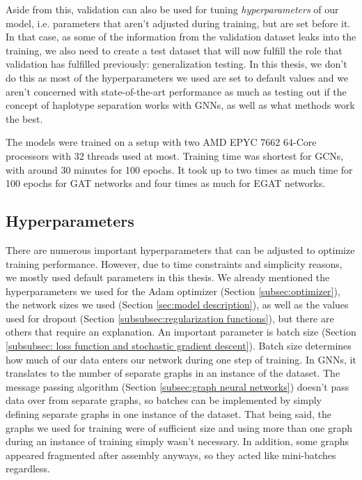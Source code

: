 \documentclass[times, utf8, diplomski, english]{fer_eng}
\begin{document}
Aside from this, validation can also be used for tuning \textit{hyperparameters} of our model, i.e. parameters that aren't adjusted during training, but are set before it. In that case, as some of the information from the validation dataset leaks into the training,  we also need to create a test dataset that will now fulfill the role that validation has fulfilled previously: generalization testing. In this thesis, we don't do this as most of the hyperparameters we used are set to default values and we aren't concerned with state-of-the-art performance as much as testing out if the concept of haplotype separation works with GNNs, as well as what methods work the best.

The models were trained on a setup with two AMD EPYC 7662 64-Core processors with 32 threads used at most. Training time was shortest for GCNs, with around 30 minutes for 100 epochs. It took up to two times as much time for 100 epochs for GAT networks and four times as much for EGAT networks.

\subsection{Hyperparameters}
\label{subsec:hyperparameters}

There are numerous important hyperparameters that can be adjusted to optimize training performance. However, due to time constraints and simplicity reasons, we mostly used default parameters in this thesis. We already mentioned the hyperparameters we used for the Adam optimizer (Section \ref{subsec:optimizer}), the network sizes we used (Section \ref{sec:model description}), as well as the values used for dropout (Section \ref{subsubsec:regularization functions}), but there are others that require an explanation. An important parameter is batch size (Section \ref{subsubsec: loss function and stochastic gradient descent}). Batch size determines how much of our data enters our network during one step of training. In GNNs, it translates to the number of separate graphs in an instance of the dataset. The message passing algorithm (Section \ref{subsec:graph neural networks}) doesn't pass data over from separate graphs, so batches can be implemented by simply defining separate graphs in one instance of the dataset. That being said, the graphs we used for training were of sufficient size and using more than one graph during an instance of training simply wasn't necessary. In addition, some graphs appeared fragmented after assembly anyways, so they acted like mini-batches regardless.
\end{document}
